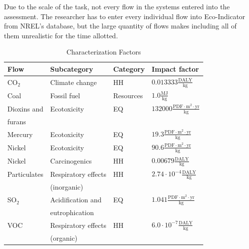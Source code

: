 \documentclass[final,journal,10pt,letterpaper,oneside,twocolumn,compsoc]%
{IEEEtran}
\begin{document}
Due to the scale of the task, not every flow in the systems entered into the
assessment. The researcher has to enter every individual flow into
Eco-Indicator from NREL's database, but the large quantity of flows makes
including all of them unrealistic for the time allotted.

\begin{table}[t!]
  \caption{Characterization Factors}
  \label{tab:8}
  \centering
    \begin{tabular}{| l | l | l | l |}
      \hline
      Flow & Subcategory & Category & Impact factor \\
      \hline
      CO$_2$   & Climate change  & HH      & 
        $0.013333 \frac{\textrm{DALY}}{\textrm{kg}}$ \\
      Coal & Fossil fuel     & Resources          &
        $1.0 \frac{\textrm{MJ}}{\textrm{kg}}$ \\
      Dioxins and & Ecotoxicity & EQ & $132000 \frac{\textrm{
        PDF} \cdot \textrm{m}^2 \cdot \textrm{yr}}{\textrm{kg}}$ \\
        \hspace{5mm} furans & & &  \\
      Mercury & Ecotoxicity & EQ & $19.3 \frac{\textrm{PDF} \cdot
        \textrm{m}^2 \cdot \textrm{yr}}{\textrm{kg}}$ \\
      Nickel  & Ecotoxicity & EQ & $90.6 \frac{\textrm{PDF} \cdot
        \textrm{m}^2 \cdot \textrm{yr}}{\textrm{kg}}$ \\
      Nickel  & Carcinogenics & HH &
        $0.00679 \frac{\textrm{DALY}}{\textrm{kg}}$ \\
      Particulates & Respiratory effects      & HH &
        $2.74 \cdot 10^{-4} \frac{\textrm{DALY}}{\textrm{kg}}$ \\
                   & \hspace{5mm} (inorganic) &              &  \\
      SO$_2$ & Acidification and & EQ & $1.041 \frac{
        \textrm{PDF} \cdot \textrm{m}^2 \cdot \textrm{yr}}{\textrm{kg}}$ \\
                     & \hspace{5mm} eutrophication & & \\
      VOC & Respiratory effects & HH &
        $6.0 \cdot 10^{-7} \frac{\textrm{DALY}}{\textrm{kg}}$ \\
          & \hspace{5mm} (organic) & &  \\
      \hline
    \end{tabular}
\end{table}
\end{document}
